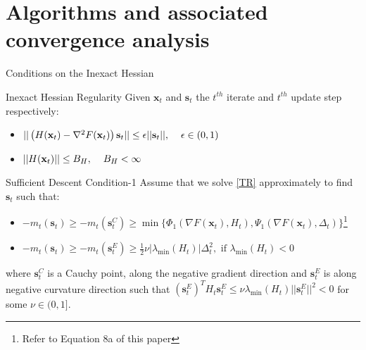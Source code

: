 \documentclass[10pt]{beamer}
\newcommand{\h}{\nabla^{2}}
\newcommand{\g}{\nabla}
\newcommand{\xbold}{\mathbf{x}}
\newcommand{\sbold}{\mathbf{s}}
\newcommand{\mineig}{\lambda_{\min}}
\begin{document}
\section{Algorithms and associated convergence analysis}
\begin{frame}{Conditions on the Inexact Hessian}
\begin{alertblock}{Inexact Hessian Regularity}
Given \(\xbold_{t}\) and \(\sbold_{t}\) the \(t^{th}\) iterate and \(t^{th}\) update step respectively:
\begin{itemize}
\item \(||\left(H(\xbold_{t}) - \h F(\xbold_{t})\right)\sbold_{t}|| \leq \epsilon||\sbold_{t}||, \hspace{4mm} \epsilon \in (0,1)\)
\item \(||H(\xbold_{t}) || \leq B_{H}, \hspace{4mm} B_{H} < \infty\)
\end{itemize}
\end{alertblock}
\pause
\begin{alertblock}{Sufficient Descent Condition-1}
Assume that we solve \ref{TR} approximately to find \(\sbold_{t}\) such that:
\begin{itemize}
\item \(-m_{t}(\sbold_{t}) \geq -m_{t}(\sbold_{t}^{C}) \geq \min\lbrace\Phi_{1}(\g F(\xbold_{t}), H_{t}), \Psi_{1}(\g F(\xbold_{t}), \Delta_{t})\rbrace \)\footnote{Refer to Equation 8a of this paper}
\item \(-m_{t}(\sbold_{t}) \geq -m_{t}(\sbold_{t}^{E}) \geq \frac{1}{2}\nu|\mineig(H_{t})|\Delta_{t}^{2}, \text{ if } \mineig(H_{t}) < 0 \)
\end{itemize}
where \(\sbold_{t}^{C}\) is a Cauchy point, along the negative gradient direction and \(\sbold_{t}^{E}\) is along negative curvature direction such that \((\sbold_{t}^{E})^{T} H_{t} \sbold_{t}^{E} \leq \nu\mineig(H_{t})||\sbold_{t}^{E}||^{2} < 0\) for some \(\nu \in (0, 1]\).
\end{alertblock}
\end{frame}
\end{document}
